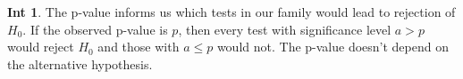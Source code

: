 \documentclass[8pt,a4paper,landscape]{article}
\theoremstyle{definition}
\theoremstyle{example}
\theoremstyle{intuition}
\newtheorem*{intuition}{Int}
\theoremstyle{definition}
\begin{document}
\begin{multicols}{3}
				\begin{intuition}
					The p-value informs us which tests in our family would lead to rejection of $H_0$. If the observed p-value is $p$, then every test with significance level $a > p$ would reject $H_0$ and those with $a \leq p$ would not. The p-value doesn't depend on the alternative hypothesis.
				\end{intuition}




	
\end{multicols}	
\end{document}
